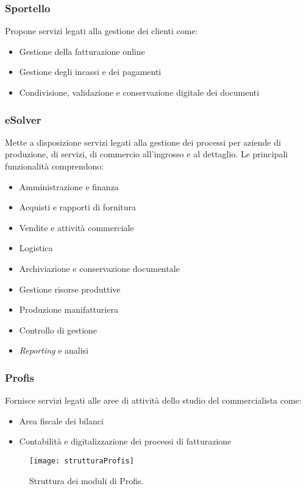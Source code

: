 \subsubsection*{Sportello}
Propone servizi legati alla gestione dei clienti come:  
\begin{itemize}
    \item Gestione della fatturazione online 
    \item Gestione degli incassi e dei pagamenti 
    \item Condivisione, validazione e conservazione digitale dei documenti  
\end{itemize}

\subsubsection*{eSolver}
Mette a disposizione servizi legati alla gestione dei processi per aziende di produzione, di servizi, di commercio all'ingrosso e al dettaglio. 
Le principali funzionalità comprendono: 
\begin{itemize}
    \item Amministrazione e finanza 
    \item Acquisti e rapporti di fornitura 
    \item Vendite e attività commerciale 
    \item Logistica
    \item Archiviazione e conservazione documentale
    \item Gestione risorse produttive 
    \item Produzione manifatturiera  
    \item Controllo di gestione 
    \item \emph{Reporting} e analisi 
\end{itemize}

\subsubsection*{Profis}
Fornisce servizi legati alle aree di attività dello studio del commercialista come: 
\begin{itemize}
    \item Area fiscale dei bilanci 
    \item Contabilità e digitalizzazione dei processi di fatturazione  
\end{itemize}
\begin{figure}[htbp] 
    \centering 
    \texttt{[image: strutturaProfis]}
    \caption{Struttura dei moduli di Profis.}
    \label{fig:strutturaProfis}
\end{figure}


